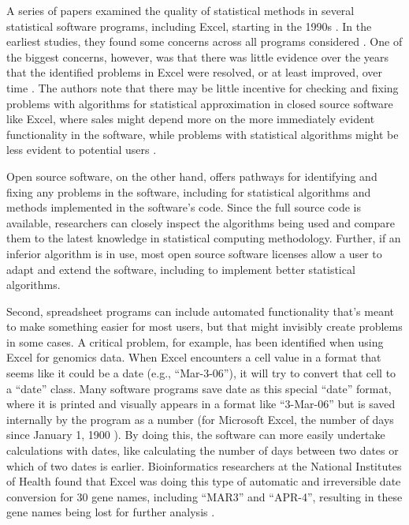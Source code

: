 \documentclass[]{tufte-book}
\begin{document}
A series of papers examined the quality of statistical methods in several
statistical software programs, including Excel, starting in the 1990s
\citep{mccullough1999accuracy, mccullough1999assessing, mccullough2002accuracy, mccullough2005accuracy, mccullough2008accuracy, melard2014accuracy}. In the
earliest studies, they found some concerns across all programs considered
\citep{mccullough1999accuracy, mccullough1999assessing}. One of the biggest
concerns, however, was that there was little evidence over the years that the
identified problems in Excel were resolved, or at least improved, over time
\citep{mccullough2001does, mccullough2008accuracy}. The authors note that there may
be little incentive for checking and fixing problems with algorithms for
statistical approximation in closed source software like Excel, where sales
might depend more on the more immediately evident functionality in the software,
while problems with statistical algorithms might be less evident to potential
users \citep{mccullough2001does}.

Open source software, on the other hand, offers pathways for identifying and fixing
any problems in the software, including for statistical algorithms and methods
implemented in the software's code. Since the full source code is available, researchers
can closely inspect the algorithms being used and compare them to the latest
knowledge in statistical computing methodology. Further, if an inferior algorithm is in
use, most open source software licenses allow a user to adapt and extend the software,
including to implement better statistical algorithms.

Second, spreadsheet programs can include automated functionality that's meant to
make something easier for most users, but that might invisibly create problems
in some cases. A critical problem, for example, has been identified when using
Excel for genomics data. When Excel encounters a cell value in a format that
seems like it could be a date (e.g., ``Mar-3-06''), it will try to convert that
cell to a ``date'' class. Many software programs save date as this special ``date''
format, where it is printed and visually appears in a format like ``3-Mar-06'' but
is saved internally by the program as a number (for Microsoft Excel, the number
of days since January 1, 1900 \citep{willekens2013chronological}). By doing this, the
software can more easily undertake calculations with dates, like calculating the
number of days between two dates or which of two dates is earlier.
Bioinformatics researchers at the National Institutes of Health found that Excel
was doing this type of automatic and irreversible date conversion for 30 gene
names, including ``MAR3'' and ``APR-4'', resulting in these gene names being lost
for further analysis \citep{zeeberg2004mistaken}.
\end{document}
